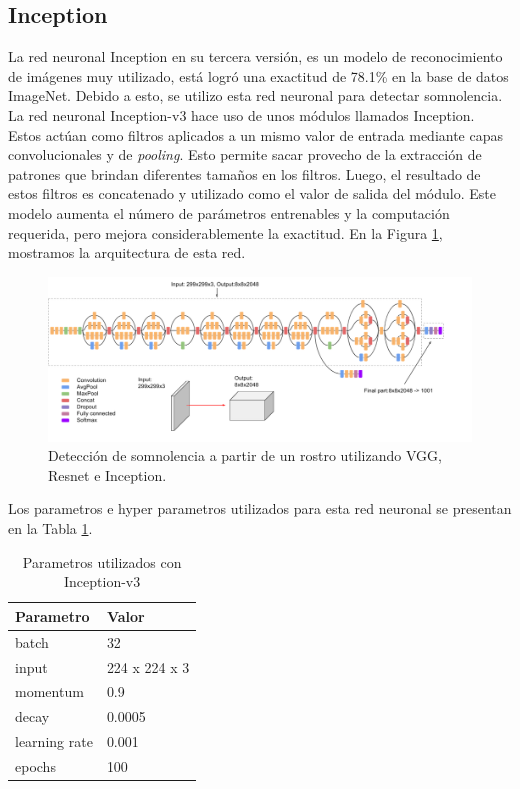 \documentclass{article}
\begin{document}
	\subsection{Inception}
	
	La red neuronal Inception \cite{szegedy2016rethinking} en su tercera versión, es un modelo de reconocimiento de imágenes muy utilizado, está logró una exactitud de 78.1\% en la base de datos ImageNet. Debido a esto, se utilizo esta red neuronal para detectar somnolencia. \\
	
	La red neuronal Inception-v3 hace uso de unos módulos llamados Inception. Estos actúan como filtros aplicados a un mismo valor de entrada mediante capas convolucionales y de \textit{pooling}. Esto permite sacar provecho de la extracción de patrones que brindan diferentes tamaños en los filtros. Luego, el resultado de estos filtros es concatenado y utilizado como el valor de salida del módulo. Este modelo aumenta el número de parámetros entrenables y la computación requerida, pero mejora considerablemente la exactitud. En la Figura \ref{fig:inception}, mostramos la arquitectura de esta red.
	
	
	
	\begin{figure}[H]
		\centering
		\includegraphics[width=\textwidth]{img/inception}		
		\caption{Detección de somnolencia a partir de un rostro utilizando VGG, Resnet e Inception.}
		\label{fig:inception}
	\end{figure}

	Los parametros e hyper parametros utilizados para esta red neuronal se presentan en la Tabla \ref{tab:inception}.
	
	\begin{table}[H]
		\centering		
		\caption{Parametros utilizados con Inception-v3}
		\label{tab:inception}
		\begin{tabular}{ p{3cm} p{3cm}}
			\hline 
			\textbf{Parametro} & \textbf{Valor}   \\
			\hline 
			batch & 32 \\
			input & 224 x 224 x 3 \\
			momentum & 0.9 \\
			decay & 0.0005 \\
			learning rate & 0.001 \\
			epochs & 100 \\
			\hline 
		\end{tabular}
	\end{table}
\end{document}
